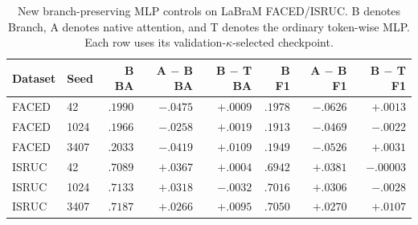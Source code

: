 \begin{table}[!ht]
\centering
\caption{New branch-preserving MLP controls on LaBraM FACED/ISRUC. B denotes Branch, A denotes native attention, and T denotes the ordinary token-wise MLP. Each row uses its validation-$\kappa$-selected checkpoint.}
\label{tab:operator-new-seeds}
\small
\setlength{\tabcolsep}{3pt}
\begin{tabular}{@{}llrrrrrr@{}}
\toprule
Dataset & Seed & B BA & A $-$ B BA & B $-$ T BA & B F1 & A $-$ B F1 & B $-$ T F1 \\
\midrule
FACED & 42 & $.1990$ & $-.0475$ & $+.0009$ & $.1978$ & $-.0626$ & $+.0013$ \\
FACED & 1024 & $.1966$ & $-.0258$ & $+.0019$ & $.1913$ & $-.0469$ & $-.0022$ \\
FACED & 3407 & $.2033$ & $-.0419$ & $+.0109$ & $.1949$ & $-.0526$ & $+.0031$ \\
ISRUC & 42 & $.7089$ & $+.0367$ & $+.0004$ & $.6942$ & $+.0381$ & $-.00003$ \\
ISRUC & 1024 & $.7133$ & $+.0318$ & $-.0032$ & $.7016$ & $+.0306$ & $-.0028$ \\
ISRUC & 3407 & $.7187$ & $+.0266$ & $+.0095$ & $.7050$ & $+.0270$ & $+.0107$ \\
\bottomrule
\end{tabular}
\end{table}
